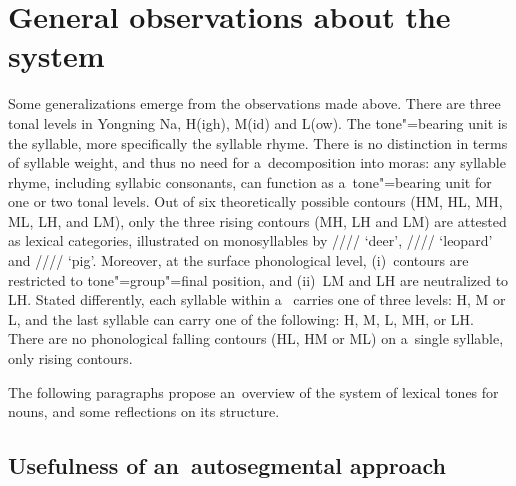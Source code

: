 {{{{{\section{General observations about the system}
\label{sec:overviewofthesystemandsomereflectionsonitsstructure}

Some generalizations emerge from the observations made above. There are three tonal levels in
Yongning Na, H(igh), M(id) and L(ow). The tone"=bearing unit is the syllable, more specifically the
syllable rhyme. There is no distinction in terms of syllable weight, and thus no need for
a~decomposition into moras: any syllable rhyme, including syllabic consonants, can function as
a~tone"=bearing unit for one or two tonal levels. Out of six theoretically possible contours (HM, HL,
MH, ML, LH, and LM), only the three rising contours (MH, LH and LM) are attested as lexical categories, illustrated on monosyllables by ////
‘deer’, //// ‘leopard’ and //// ‘pig’. Moreover, at the surface phonological level,
(i)~contours are restricted to tone"=group"=final position, and (ii)~LM and LH are neutralized to
LH. Stated differently, each syllable within a~ carries one of three levels: H, M or L, and
the last syllable can carry one of the following: H, M, L, MH, or LH. There are no phonological
falling contours (HL, HM or ML) on a~single syllable, only rising contours.

The following paragraphs propose an~overview of the system of lexical tones for nouns, and some
reflections on its structure.

\subsection{Usefulness of an~autosegmental approach}
\label{sec:autosegmentalphonology}

}}}}}
